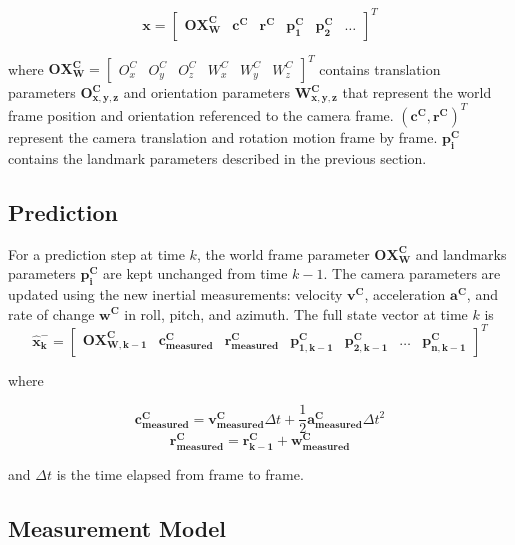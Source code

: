 \begin{equation}
\mathbf{x}=\begin{bmatrix}
\mathbf{OX_{W}^{C}} & \mathbf{c^{C}} & \mathbf{r^{C}} & 
\mathbf{p_{1}^{C}} & \mathbf{p_{2}^{C}} & \ldots 
\end{bmatrix}^T
\end{equation}

\noindent where $\mathbf{OX_{W}^{C}}= \begin{bmatrix}O_{x}^{C} &
  O_{y}^{C} & O_{z}^{C} & W_{x}^{C} & W_{y}^{C} &
  W_{z}^{C} \end{bmatrix}^{T}$ contains translation parameters
$\mathbf{O_{x,y,z}^{C}}$ and orientation parameters
$\mathbf{W_{x,y,z}^{C}}$ that represent the world frame position and
orientation referenced to the camera frame.
$\left(\mathbf{c^{C}},\mathbf{r^{C}}\right)^{T}$ represent the camera
translation and rotation motion frame by frame. $\mathbf{p_{i}^{C}}$
contains the landmark parameters described in the previous section.

\subsection{Prediction}

For a prediction step at time $k$, the world frame parameter
$\mathbf{OX_W^C}$ and landmarks parameters $\mathbf{p_i^C}$ are kept
unchanged from time $k-1$. The camera parameters are updated using the
new inertial measurements: velocity $\mathbf{v^{C}}$, acceleration
$\mathbf{a^{C}}$, and rate of change $\mathbf{w^{C}}$ in roll, pitch, and
azimuth. The full state vector at time $k$ is
\begin{equation}
\mathbf{\hat{x}_{k}^-}
=\begin{bmatrix}
\mathbf{OX_{W,k-1}^{C}} & 
\mathbf{c_{measured}^{C}} &
\mathbf{r_{measured}^{C}} & 
\mathbf{p_{1,k-1}^{C}} & 
\mathbf{p_{2,k-1}^{C}} & 
\ldots & 
\mathbf{p_{n,k-1}^C}
\end{bmatrix}^T
\end{equation}

\noindent where 

$$\mathbf{c_{measured}^{C}}=\mathbf{v_{measured}^{C}}\Delta t+ 
\frac{1}{2}\mathbf{a_{measured}^{C}}\Delta t^{2}$$
$$\mathbf{r_{measured}^{C}}=\mathbf{r_{k-1}^{C}}+ \mathbf{w_{measured}^{C}}$$

\noindent and $\Delta t$ is the time elapsed from frame to frame. 

\subsection{Measurement Model}


